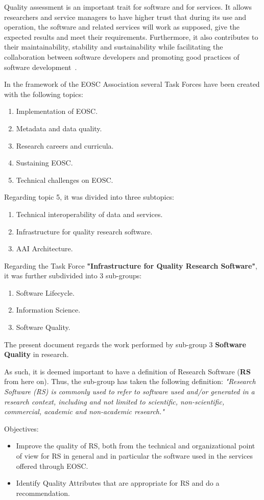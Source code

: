 Quality assessment is an important trait for software and for services. It allows researchers and service managers to have higher trust that during its use and operation, the software and related services will work as supposed, give the expected results and meet their requirements. Furthermore, it also contributes to their maintainability, stability and sustainability while facilitating the collaboration between software developers and promoting good practices of software development~\cite{eosc_synergyD31}.

In the framework of the EOSC Association several Task Forces have been created with the following topics:

\begin{enumerate}
    \item Implementation of EOSC.
    \item Metadata and data quality.
    \item Research careers and curricula.
    \item Sustaining EOSC.
    \item Technical challenges on EOSC.
\end{enumerate}

Regarding topic 5, it was divided into three subtopics:

\begin{enumerate}
    \item Technical interoperability of data and services.
    \item Infrastructure for quality research software.
    \item AAI Architecture.
\end{enumerate}

Regarding the Task Force \textbf{"Infrastructure for Quality Research Software"}, it was further subdivided into 3 sub-groups:

\begin{enumerate}
    \item Software Lifecycle.
    \item Information Science.
    \item Software Quality.
\end{enumerate}

The present document regards the work performed by sub-group 3 \textbf{Software Quality} in research.

As such, it is deemed important to have a definition of Research Software (\textbf{RS} from here on). Thus, the sub-group has taken the following definition: \textit{"Research Software (RS) is commonly used to refer to software used and/or generated in a research context, including and not limited to scientific, non-scientific, commercial, academic and non-academic research."}~\cite{gruenpeter_defining_2021}

Objectives:

\begin{itemize}
    \item Improve the quality of RS, both from the technical and organizational point of view for RS in general and in particular the software used in the services offered through EOSC.
    \item Identify Quality Attributes that are appropriate for RS and do a recommendation.
\end{itemize}
